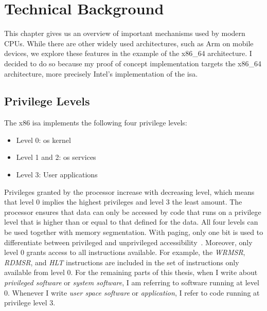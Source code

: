 \section{Technical Background}
\label{sec:state:technical}
This chapter gives us an overview of important mechanisms used by modern CPUs.
While there are other widely used architectures, such as Arm on mobile devices,
we explore these features in the example of the x86\_64 architecture. I decided
to do so because my proof of concept implementation targets the x86\_64
architecture, more precisely Intel's implementation of the \gls{isa}.

\subsection{Privilege Levels}
\label{sec:state:technical:priv}
The x86 \gls{isa} implements the following four privilege levels:
\begin{itemize}
  \item Level 0: \gls{os} kernel
  \item Level 1 and 2: \gls{os} services
  \item Level 3: User applications
\end{itemize}
Privileges granted by the processor increase with decreasing level, which means
that level 0 implies the highest privileges and level 3 the least amount. The
processor ensures that data can only be accessed by code that runs on a
privilege level that is higher than or equal to that defined for the data. All
four levels can be used together with memory segmentation. With paging, only one
bit is used to differentiate between privileged and unprivileged
accessibility~\cite{intel_sdm}. Moreover, only level 0 grants access to all
instructions available. For example, the \textit{WRMSR}, \textit{RDMSR}, and
\textit{HLT} instructions are included in the set of instructions only available
from level 0. For the remaining parts of this thesis, when I write about
\textit{privileged software} or \textit{system software}, I am referring to
software running at level 0. Whenever I write \textit{user space software} or
\textit{application}, I refer to code running at privilege level 3.

